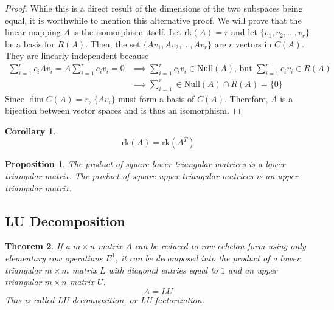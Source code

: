 \documentclass{article}
\newtheorem{theorem}{Theorem}[section]
\newtheorem{proposition}[theorem]{Proposition}
\newtheorem{corollary}{Corollary}[theorem]
\theoremstyle{remark}
\theoremstyle{definition}
\begin{document}
\begin{proof}
While this is a direct result of the dimensions of the two subspaces being equal, it is worthwhile to mention this alternative proof. We will prove that the linear mapping $A$ is the isomorphism itself. Let rk$(A) = r$ and let $\{ v_1, v_2, ..., v_r\}$ be a basis for $R(A)$. Then, the set $\{ A v_1, A v_2, ..., A v_r\}$ are $r$ vectors in $C(A)$. They are linearly independent because 
\begin{align*}
    \sum_{i = 1}^r c_i A v_i = A \sum_{i=1}^r c_i v_i = 0 & \implies \sum_{i=1}^r c_i v_i \in \text{Null}(A) \text{, but } \sum_{i=1}^r c_i v_i \in R(A) \\
    & \implies \sum_{i=1}^r \in \text{Null}(A) \cap R(A) = \{0\}
\end{align*} 
Since $\dim C(A) = r$, $\{A v_i\}$ must form a basis of $C(A)$. Therefore, $A$ is a bijection between vector spaces and is thus an isomorphism. 
\end{proof}

\begin{corollary}
\[\text{rk}(A) = \text{rk}(A^T)\]
\end{corollary}

\begin{proposition}
The product of square lower triangular matrices is a lower triangular matrix. The product of square upper triangular matrices is an upper triangular matrix. 
\end{proposition}

\subsection{LU Decomposition}
\begin{theorem}
If a $m \times n$ matrix $A$ can be reduced to row echelon form using only elementary row operations $E^1$, it can be decomposed into the product of a lower triangular $m \times m$ matrix $L$ with diagonal entries equal to $1$ and an upper triangular $m \times n$ matrix $U$. 
\[A = L U\]
This is called \textit{LU decomposition}, or \textit{LU factorization}. 
\end{theorem}
\end{document}
